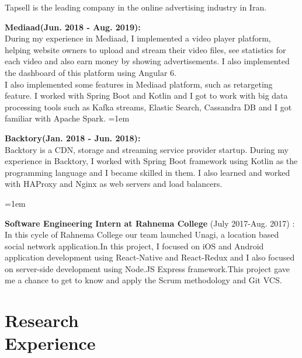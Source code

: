 \documentclass[line, mm]{sampleCV}
\begin{document}
\begin{resume}
\begin{list2}
Tapsell is the leading company in the online advertising industry in Iran.
\begin{list2}
\item \textbf{Mediaad(Jun. 2018 - Aug. 2019):}\\
During my experience in Mediaad, I implemented a video player platform, helping website owners to upload and stream their video files, see statistics for each video and also earn money by showing advertisements. I also implemented the dashboard of this platform using Angular 6.\\
I also implemented some features in Mediaad platform, such as retargeting feature. 
I worked with Spring Boot and Kotlin and I got to work with big data processing tools such as Kafka streams, Elastic Search, Cassandra DB and I got familiar with Apache Spark.
\hangindent=1em
\item \textbf{Backtory(Jan. 2018 - Jun. 2018):}\\
Backtory is a CDN, storage and streaming service provider startup. 
During my experience in Backtory, I worked with Spring Boot framework using Kotlin as the programming language and I became skilled in them. 
I also learned and worked with HAProxy and Nginx as web servers and load balancers.

\end{list2}

\hangindent=1em
\item \textbf{Software Engineering Intern at Rahnema College} (July 2017-Aug. 2017) : \\
 In this cycle of Rahnema College our team launched Unagi, a location based social network application.In this project, I focused on iOS and Android application development using React-Native and React-Redux	 and I also focused on server-side development using Node.JS Express framework.This project gave me a chance to get to know and apply the Scrum methodology and Git VCS.



\end{list2}

\section{\mysidestyle Research\\Experience} 

\begin{list2}
	

\end{list2}
\end{resume}
\end{document}

